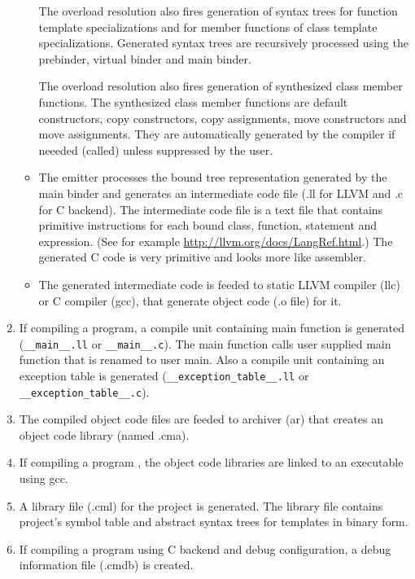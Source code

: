\documentclass[oneside, a4paper, 11pt]{article}
\begin{document}
\begin{enumerate}
\begin{itemize}
The overload resolution also fires generation of syntax trees for function template
specializations and for member functions of class template specializations.
Generated syntax trees are recursively processed using the prebinder, virtual binder
and main binder.

The overload resolution also fires generation of synthesized class member functions.
The synthesized class member functions are default constructors, copy constructors,
copy assignments, move constructors and move assignments. They are automatically
generated by the compiler if neeeded (called) unless suppressed by the user.

\item
The emitter processes the bound tree representation generated by the main binder
and generates an intermediate code file (.ll for LLVM and .c for C backend).
The intermediate code file is a text file that contains primitive instructions
for each bound class, function, statement and expression.
(See for example \url{http://llvm.org/docs/LangRef.html}.)
The generated C code is very primitive and looks more like assembler.

\item
The generated intermediate code is feeded to static LLVM compiler (llc) or
C compiler (gcc), that generate object code (.o file) for it.

\end{itemize}

\item
If compiling a program, a compile unit containing main function is generated (\verb|__main__.ll| or \verb|__main__.c|).
The main function calls user supplied main function that is renamed to user main.
Also a compile unit containing an exception table is generated
(\verb|__exception_table__.ll| or \verb|__exception_table__.c|).

\item
The compiled object code files are feeded to archiver (ar) that creates an object code library (named .cma).

\item
If compiling a program , the object code libraries are linked to an executable using gcc.

\item
A library file (.cml) for the project is generated. The library file contains project's symbol table and
abstract syntax trees for templates in binary form.

\item
If compiling a program using C backend and debug configuration, a debug information file (.cmdb) is created.

\end{enumerate}
\end{document}
